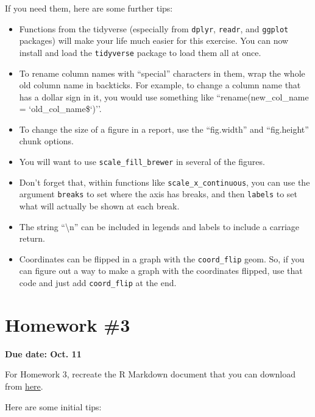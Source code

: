 \documentclass[]{book}
\providecommand{\tightlist}{%
  \setlength{\itemsep}{0pt}\setlength{\parskip}{0pt}}
\theoremstyle{definition}
\theoremstyle{definition}
\theoremstyle{definition}
\theoremstyle{remark}
\begin{document}
If you need them, here are some further tips:

\begin{itemize}
\tightlist
\item
  Functions from the tidyverse (especially from \texttt{dplyr},
  \texttt{readr}, and \texttt{ggplot} packages) will make your life much
  easier for this exercise. You can now install and load the
  \texttt{tidyverse} package to load them all at once.
\item
  To rename column names with ``special'' characters in them, wrap the
  whole old column name in backticks. For example, to change a column
  name that has a dollar sign in it, you would use something like
  ``rename(new\_col\_name = `old\_col\_name\$`)''.
\item
  To change the size of a figure in a report, use the ``fig.width'' and
  ``fig.height'' chunk options.
\item
  You will want to use \texttt{scale\_fill\_brewer} in several of the
  figures.
\item
  Don't forget that, within functions like
  \texttt{scale\_x\_continuous}, you can use the argument
  \texttt{breaks} to set where the axis has breaks, and then
  \texttt{labels} to set what will actually be shown at each break.
\item
  The string ``\textbackslash{}n'' can be included in legends and labels
  to include a carriage return.
\item
  Coordinates can be flipped in a graph with the \texttt{coord\_flip}
  geom. So, if you can figure out a way to make a graph with the
  coordinates flipped, use that code and just add \texttt{coord\_flip}
  at the end.
\end{itemize}

\section{Homework \#3}\label{homework-3}

\textbf{Due date: Oct. 11}

For Homework 3, recreate the R Markdown document that you can download
from
\href{https://github.com/geanders/RProgrammingForResearch/raw/master/Homework/Homework_3.docx}{here}.

Here are some initial tips:
\end{document}

